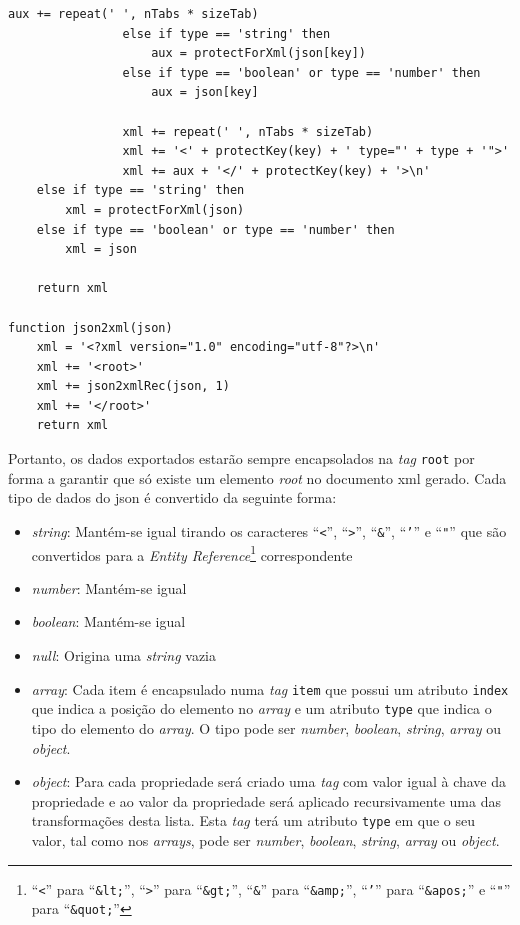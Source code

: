 \begin{lstlisting}[language=pseudocode, caption=Algorítmo de conversão de \acrshort{json} para \acrshort{xml}]
                    aux += repeat(' ', nTabs * sizeTab)
                else if type == 'string' then
                    aux = protectForXml(json[key])
                else if type == 'boolean' or type == 'number' then
                    aux = json[key]

                xml += repeat(' ', nTabs * sizeTab)
                xml += '<' + protectKey(key) + ' type="' + type + '">'
                xml += aux + '</' + protectKey(key) + '>\n'
    else if type == 'string' then
        xml = protectForXml(json)
    else if type == 'boolean' or type == 'number' then
        xml = json

    return xml

function json2xml(json)
    xml = '<?xml version="1.0" encoding="utf-8"?>\n'
    xml += '<root>'
    xml += json2xmlRec(json, 1)
    xml += '</root>'
    return xml
\end{lstlisting}

Portanto, os dados exportados estarão sempre encapsolados na \textit{tag} \texttt{root} por forma a garantir que só existe um elemento \textit{root} no documento \acrshort{xml} gerado. Cada tipo de dados do \acrshort{json} é convertido da seguinte forma:
\begin{itemize}
    \item \textit{string}: Mantém-se igual tirando os caracteres ``\texttt{<}'', ``\texttt{>}'', ``\texttt{\&}'', ``\texttt{'}'' e ``\texttt{"}'' que são convertidos para a \textit{Entity Reference}\footnote{``\texttt{<}'' para ``\texttt{\&lt;}'', ``\texttt{>}'' para ``\texttt{\&gt;}'', ``\texttt{\&}'' para ``\texttt{\&amp;}'', ``\texttt{'}'' para ``\texttt{\&apos;}'' e ``\texttt{"}'' para ``\texttt{\&quot;}''} correspondente
    \item \textit{number}: Mantém-se igual
    \item \textit{boolean}: Mantém-se igual
    \item \textit{null}: Origina uma \textit{string} vazia
    \item \textit{array}: Cada item é encapsulado numa \textit{tag} \texttt{item} que possui um atributo \texttt{index} que indica a posição do elemento no \textit{array} e um atributo \texttt{type} que indica o tipo do elemento do \textit{array}. O tipo pode ser \textit{number}, \textit{boolean}, \textit{string}, \textit{array} ou \textit{object}.
    \item \textit{object}: Para cada propriedade será criado uma \textit{tag} com valor igual à chave da propriedade e ao valor da propriedade será aplicado recursivamente uma das transformações desta lista. Esta \textit{tag} terá um atributo \texttt{type} em que o seu valor, tal como nos \textit{arrays}, pode ser \textit{number}, \textit{boolean}, \textit{string}, \textit{array} ou \textit{object}.
\end{itemize}

